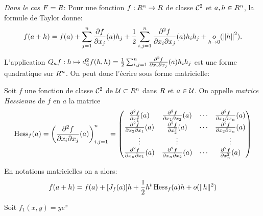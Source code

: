 \sld{\vfill\pagebreak[5]}%
\emph{Dans le cas $F=R$}: Pour une fonction $f: R^n \to R$ de classe $\mathcal{C}^2$ et $a,h\in R^n$, la formule de Taylor donne:
	\[
		f(a+h) = f(a) + \sum_{j=1}^n \frac{\partial f}{\partial x_j}(a) h_j + \frac{1}{2} \sum_{i,j=1}^n \frac{\partial^2 f}{\partial x_i \partial x_j}(a) h_i h_j + \underset{h\to 0}{o} (\left\lVert h\right\rVert^2).
	\]

L'application $Q_a f: h \mapsto d_a^2 f(h,h) =  \frac{1}{2} \sum_{i,j=1}^n \frac{\partial^2 f}{\partial x_i \partial x_j}(a) h_i h_j  $ est une forme quadratique sur $R^n$. On peut donc l'écrire sous forme matricielle:
	\begin{definition}
		Soit $f$ une fonction de classe $\mathcal{C}^2$ de $\mathcal{U} \subset R^n$ dans $R$ et $a\in\mathcal{U}$. On appelle \emph{matrice Hessienne} de $f$ en $a$ la matrice 
		\[
			\operatorname{Hess}_f (a) =\left(\frac{\partial^2 f}{\partial x_i \partial x_j}(a)  \right)_{i,j=1}^n = \begin{pmatrix}
			\frac{\partial^2 f}{\partial x_1^2}(a) & \frac{\partial^2 f}{\partial x_1 \partial x_2}(a) & \cdots & \frac{\partial^2 f}{\partial x_1 \partial x_n}(a)	\\
			\frac{\partial^2 f}{\partial x_2 \partial x_1}(a)&   \frac{\partial^2 f}{\partial x_2^2}(a) & \cdots &  \frac{\partial^2 f}{\partial x_2 \partial x_n}(a)	\\
			\vdots & \vdots& & \vdots \\
			\frac{\partial^2 f}{\partial x_n \partial x_1}(a)& \frac{\partial^2 f}{\partial x_n \partial x_2}(a)& \cdots & \frac{\partial^2 f}{\partial x_n^2}(a) 	\\

			\end{pmatrix}
		\]
	\end{definition}

En notations matricielles on a alors:
\[
f(a+h) = f(a) + [J_f (a)] h + \frac{1}{2} h^t \operatorname{Hess}_f (a) h + o(\lVert h\rVert^2)
\]


	\begin{exemple}
	Soit $f_1(x,y) = y e^x$  
	\pl{\rep{4cm}}
	\end{exemple}


